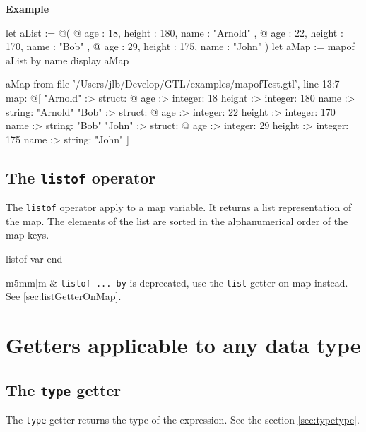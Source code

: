 \documentclass[10pt,openright,twosides]{report}
\newcommand{\gtltype}[1]{{\small\ttfamily #1}}
\newcommand{\gtlinline}[1]{\colorbox{light-blue}{\lstinline[language=gtl]{#1}}}
\newcommand{\example}{\vspace{.75em}\noindent\textbf{Example}\vspace{0em}}
\newcommand\Warning{%
 \makebox[1.4em][c]{%
 \makebox[0pt][c]{\raisebox{-.05em}{\scriptsize!}}%
 \makebox[0pt][c]{\raisebox{-.2em}{\color{red}\Large$\bigtriangleup$}}}}%
\newcommand{\warning}[1]{%
\vspace{1em}
\hspace{-18.3mm}
\rowcolors{1}{white}{light-gray}
\begin{tabular}[b]{m{5mm}|m{\linewidth}}
\Warning & #1\\
\end{tabular}
}
\begin{document}
\example
\begin{gtl}
let aList := @(
  @{ age : 18, height : 180, name : "Arnold" },
  @{ age : 22, height : 170, name : "Bob"    },
  @{ age : 29, height : 175, name : "John"   }
)
let aMap := mapof aList by name
display aMap
\end{gtl}
\begin{console}
aMap from file '/Users/jlb/Develop/GTL/examples/mapofTest.gtl', line 13:7
  - map: @[
    "Arnold" :>
        struct: @{
            age :>
                integer: 18
            height :>
                integer: 180
            name :>
                string: "Arnold"
        }
    "Bob" :>
        struct: @{
            age :>
                integer: 22
            height :>
                integer: 170
            name :>
                string: "Bob"
        }
    "John" :>
        struct: @{
            age :>
                integer: 29
            height :>
                integer: 175
            name :>
                string: "John"
        }
]
\end{console}

\subsection{The \texttt{listof} operator}

The \gtlinline{listof} operator apply to a \gtltype{map} variable. It returns a \gtltype{list} representation of the \gtltype{map}. The elements of the \gtltype{list} are sorted in the alphanumerical order of the \gtltype{map} keys.

\begin{gtl}
listof var end
\end{gtl}

\warning{\gtlinline{listof ... by} is deprecated, use the \gtlinline{list} getter on \gtltype{map} instead. See \ref{sec:listGetterOnMap}.}


\section{Getters applicable to any data type}

\subsection{The \texttt{type} getter} 
\label{sec:type}

The \gtlinline{type} getter returns the type of the expression. See the section \ref{sec:typetype}.
\end{document}
